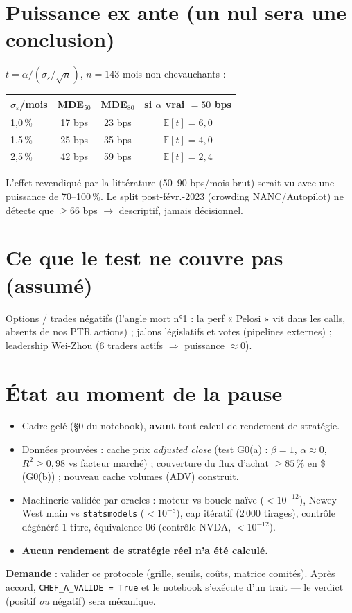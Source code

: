 \documentclass[10pt,a4paper,twocolumn]{article}
\begin{document}
\section{Puissance ex ante (un nul sera une conclusion)}
$t=\alpha/(\sigma_\varepsilon/\sqrt{n})$, $n=143$ mois non chevauchants :
\begin{center}\small
\begin{tabular}{@{}lccc@{}}
\toprule
$\sigma_\varepsilon$/mois & MDE$_{50}$ & MDE$_{80}$ & si $\alpha$ vrai $=50$ bps \\
\midrule
1,0\,\% & 17 bps & 23 bps & $\mathbb{E}[t]=6{,}0$ \\
1,5\,\% & 25 bps & 35 bps & $\mathbb{E}[t]=4{,}0$ \\
2,5\,\% & 42 bps & 59 bps & $\mathbb{E}[t]=2{,}4$ \\
\bottomrule
\end{tabular}
\end{center}
L'effet revendiqué par la littérature (50--90 bps/mois brut) serait vu avec une puissance de 70--100\,\%. Le split post-févr.-2023 (crowding NANC/Autopilot) ne détecte que $\geq66$ bps $\to$ descriptif, jamais décisionnel.

\section{Ce que le test ne couvre pas (assumé)}
Options / trades négatifs (l'angle mort n°1 : la perf « Pelosi » vit dans les calls, absents de nos PTR actions) ; jalons législatifs et votes (pipelines externes) ; leadership Wei-Zhou (6 traders actifs $\Rightarrow$ puissance $\approx0$).

\section{État au moment de la pause}
\begin{itemize}
  \item Cadre gelé (\S0 du notebook), \textbf{avant} tout calcul de rendement de stratégie.
  \item Données prouvées : cache prix \emph{adjusted close} (test G0(a) : $\beta=1$, $\alpha\approx0$, $R^2\geq0{,}98$ vs facteur marché) ; couverture du flux d'achat $\geq85\,\%$ en \$ (G0(b)) ; nouveau cache volumes (ADV) construit.
  \item Machinerie validée par oracles : moteur vs boucle naïve ($<10^{-12}$), Newey-West main vs \texttt{statsmodels} ($<10^{-8}$), cap itératif (2\,000 tirages), contrôle dégénéré 1 titre, équivalence 06 (contrôle NVDA, $<10^{-12}$).
  \item \textbf{Aucun rendement de stratégie réel n'a été calculé.}
\end{itemize}
\vspace{2pt}
\textbf{Demande} : valider ce protocole (grille, seuils, coûts, matrice comités). Après accord, \texttt{CHEF\_A\_VALIDE = True} et le notebook s'exécute d'un trait — le verdict (positif \emph{ou} négatif) sera mécanique.
\end{document}
